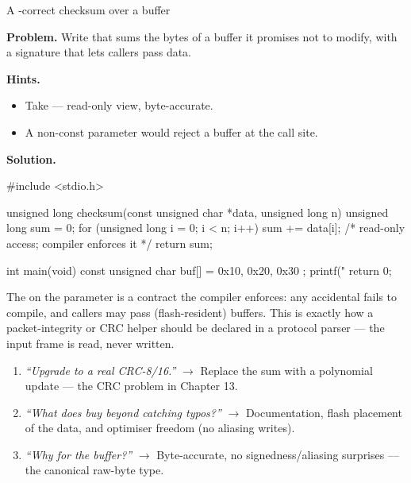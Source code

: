 \begin{gymproblem}{A -correct checksum over a buffer}

\textbf{Problem.} Write  that sums the bytes of a buffer it
promises not to modify, with a signature that lets callers pass
 data.

\textbf{Hints.}
\begin{itemize}
\item Take  --- read-only view, byte-accurate.
\item A non-const parameter would reject a  buffer at the call
  site.
\end{itemize}

\attempt

\textbf{Solution.}
\begin{cgym}
#include <stdio.h>

unsigned long checksum(const unsigned char *data, unsigned long n) {
    unsigned long sum = 0;
    for (unsigned long i = 0; i < n; i++) {
        sum += data[i];          /* read-only access; compiler enforces it */
    }
    return sum;
}

int main(void) {
    const unsigned char buf[] = { 0x10, 0x20, 0x30 };
    printf("%
    return 0;
}
\end{cgym}

The  on the parameter is a contract the compiler enforces: any
accidental  fails to compile, and callers may pass
 (flash-resident) buffers. This is exactly how a packet-integrity
or CRC helper should be declared in a protocol parser --- the input frame is
read, never written.

\followups
\begin{enumerate}
\item \emph{``Upgrade to a real CRC-8/16.''} $\rightarrow$ Replace the sum
  with a polynomial update --- the CRC problem in Chapter 13.
\item \emph{``What does  buy beyond catching typos?''}
  $\rightarrow$ Documentation, flash placement of the data, and optimiser
  freedom (no aliasing writes).
\item \emph{``Why  for the buffer?''} $\rightarrow$
  Byte-accurate, no signedness/aliasing surprises --- the canonical raw-byte
  type.
\end{enumerate}
\end{gymproblem}


